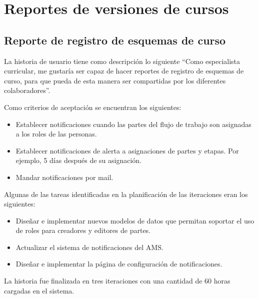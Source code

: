 \section{Reportes de versiones de cursos}
\subsection{Reporte de registro de esquemas de curso}
La historia de usuario tiene como descripción lo siguiente \enquote{Como especialista curricular, me gustaría ser capaz de hacer reportes de registro de esquemas de curso, para que pueda de esta manera ser compartidas por los diferentes colaboradores}.

Como criterios de aceptación se encuentran los siguientes:
\begin{itemize}
	\item Establecer notificaciones cuando las partes del flujo de trabajo son asignadas a los roles de las personas.
	\item Establecer notificaciones de alerta a asignaciones de partes y etapas. Por ejemplo, 5 días después de su asignación.
	\item Mandar notificaciones por mail.
\end{itemize}

Algunas de las tareas identificadas en la planificación de las iteraciones eran los siguientes:
\begin{itemize}
	\item Diseñar e implementar nuevos modelos de datos que permitan soportar el uso de roles para creadores y editores de partes.
	\item Actualizar el sistema de notificaciones del AMS.
	\item Diseñar e implementar la página de configuración de notificaciones.
\end{itemize}

La historia fue finalizada en tres iteraciones con una cantidad de 60 horas cargadas en el sistema.